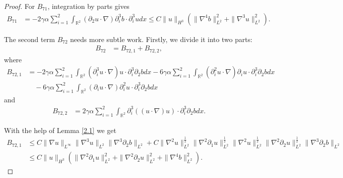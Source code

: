 \documentclass[reqno,11pt]{amsart}
\def\R{\mathbb R}
\numberwithin{Thm}{section}
\begin{document}
\begin{proof}
For $B_{71}$, integration by parts  gives
\begin{align}\label{A12}
B_{71}&=-2\gamma\alpha\sum_{i=1}^2\int_{\R^2}(\partial_2u\cdot\nabla)\partial_i^3 b\cdot \partial_i^3udx
\leq C\|u\|_{H^{3}}
(\|\nabla^4 b\|_{L^2}^2+\|\nabla^3u\|_{L^2}^2).
\end{align}


The second term $B_{72}$ needs more subtle work. Firstly, we divide it into two parts:
\begin{align}
B_{72}
&=B_{72,1}+B_{72,2}, \label{B72-de}
\end{align}
where
\begin{align*}
B_{72,1}&=-2\gamma\alpha\sum_{i=1}^2\int_{\R^2}(\partial_i^3u\cdot\nabla) u\cdot\partial_i^3\partial_2 bdx-6\gamma\alpha\sum_{i=1}^2\int_{\R^2}(\partial_i^2u\cdot\nabla)\partial_i u\cdot\partial_i^3\partial_2 bdx\\
&\quad-6\gamma\alpha\sum_{i=1}^2\int_{\R^2}(\partial_i u\cdot\nabla)\partial_i^2u\cdot\partial_i^3\partial_2 bdx
\end{align*}
and
\begin{align*}
B_{72,2}&=2\gamma\alpha\sum_{i=1}^2\int_{\R^2}\partial_i^3((u\cdot\nabla) u)\cdot\partial_i^3\partial_2 bdx.
\end{align*}



With the help of  Lemma \ref{2.1}  we get
\begin{align}\label{A13}
B_{72,1}
&\leq
C\|\nabla u\|_{L^{\infty}}\|\nabla^3u\|_{L^2}\|\nabla^3\partial_2 b\|_{L^2}+C\|\nabla^2 u\|_{L^{2}}^{\frac{1}{2}}\|\nabla^2\partial_1u\|_{L^{2}}^{\frac{1}{2}}\|\nabla^2 u\|_{L^{2}}^{\frac{1}{2}}\| \nabla^2\partial_2u\|_{L^{2}}^{\frac{1}{2}}\|\nabla^3\partial_2b\|_{L^2}\nonumber\\
&\leq C\| u\|_{H^{3}}(\|\nabla^2\partial_1u\|_{L^2}^2+\|\nabla^2\partial_2u\|_{L^2}^2+\|\nabla^4 b\|_{L^2}^2).
\end{align}



\end{proof}
\end{document}
